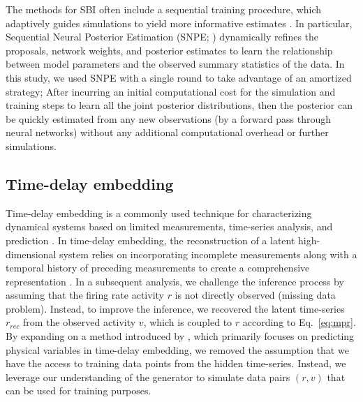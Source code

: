 \documentclass[preprint,11pt,authoryear]{elsarticle}
\begin{document}
The methods for SBI often include a sequential training procedure, which adaptively guides simulations to yield more informative estimates \citep{Papamakarios2019b, Lueckmann2019, Durkan2020, Wiqvist2021, Deistler2022}. In particular, Sequential Neural Posterior Estimation (SNPE; \cite{Greenberg2019, Goncalves2020})  dynamically refines the proposals, network weights, and posterior estimates to learn the relationship between model parameters and the observed summary statistics of the data. In this study, we used SNPE with a single round to take advantage of an amortized strategy; After incurring an initial computational cost for the simulation and training steps to learn all the joint posterior distributions, then the posterior can be quickly estimated from any new observations (by a forward pass through neural networks)  without any additional computational overhead or further simulations.




\subsection{Time-delay embedding}

Time-delay embedding is a commonly used technique for characterizing dynamical systems based on limited measurements, time-series analysis, and prediction \citep{Takens2006}. In time-delay embedding, the reconstruction of a latent high-dimensional system relies on incorporating incomplete measurements along with a temporal history of preceding measurements to create a comprehensive representation \citep{Kennel1992, Hirsh2021}.
In a subsequent analysis, we challenge the inference process by assuming that the firing rate activity $r$ is not directly observed (missing data problem). Instead, to improve the inference, we recovered the latent time-series $r_{rec}$ from the observed activity $v$, which is coupled to $r$ according to Eq.~\ref{eq:mpr}.
By expanding on a method introduced by \cite{Abarbanel}, which primarily focuses on predicting physical variables in time-delay embedding, we removed the assumption that we have the access to training data points from the hidden time-series. Instead, we leverage our understanding of the generator to simulate data pairs $(r, v)$ that can be used for training purposes.
\end{document}
